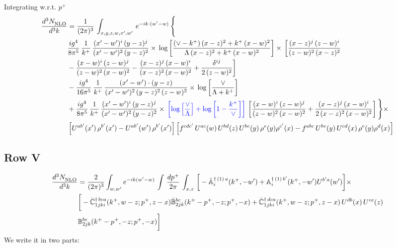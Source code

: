 \documentclass[9pt]{article}
\def\mf#1{\mathbb{#1}}
\numberwithin{equation}{section}
\begin{document}
Integrating w.r.t. $p^{+}$
\begin{align}
    \frac{d^{3}N_{\rm NLO}^{\rm}}{d^{3}k}  & =  \frac{1}{(2\pi)^{3}}\,
    \int_{x,y,z,w,x',w'}\,e^{-ik\cdot (w^\prime-w)}\,\Bigg\{\notag \\ & \frac{ig^{4}}{8\pi^{5}}\,\frac{1}{k^{+}}\,\frac{(x'-w')^{i}\,(y-z)^{j}}{(x'-w')^{2}\,(y-z)^{2}}\times\,\log{\left[\frac{(\vee-k^{+})\,(x-z)^{2}+k^{+}\,(x-w)^{2}}{\Lambda\, (x-z)^{2} + k^{+}\,(x-w)^{2}}\right]}\times\, \bigg[\frac{(x-z)^{j}\,(z-w)^{i}}{(z-w)^{2}\,(x-z)^{2}}\notag \\ & -\frac{(x-w)^{i}\,(z-w)^{j}}{(z-w)^{2}\,(x-w)^{2}}-\frac{(x-z)^{j}\,(x-w)^{i}}{(x-z)^{2}\,(x-w)^{2}}+\frac{\delta^{ij}}{2\,(z-w)^{2}}\bigg]\notag \\ & -\frac{ig^{4}}{16\pi^{5}}\,\frac{1}{k^{+}}\,\frac{(x'-w')\cdot (y-z)}{(x'-w')^{2}\,(y-z)^{2}\,(z-w)^{2}}\times\,\log{\left[\frac{\vee}{\Lambda + k^{+}}\right]}\notag \\ & + \frac{ig^{4}}{8\pi^{5}}\,\frac{1}{k^{+}}\,\frac{(x'-w')^{i}\,(y-z)^{j}}{(x'-w')^{2}\,(y-z)^{2}}\times\,{\color{blue}\left[\log{\left[\frac{\vee}{\Lambda}\right]} + \log{\left[1-\frac{k^{+}}{\vee}\right]}\right]}\,\left[\frac{(x-w)^{i}\,(z-w)^{j}}{(z-w)^{2}\,(x-w)^{2}}+\frac{(x-z)^{j}\,(x-w)^{i}}{2\, (x-z)^{2}\,(x-w)^{2}}\right] \Bigg\}\times\notag \\ &  \left[U^{ab'}(x')\,\rho^{b'}(x')-U^{ab'}(w')\,\rho^{b'}(x')\right] \left[f^{cdc'}\,U^{ac}(w)\,U^{bd}(z)\,U^{be}(y)\,\rho^{e}(y)\rho^{c'}(x)-f^{abc}\,U^{be}(y)\,U^{cd}(x)\,\rho^{e}(y)\rho^{d}(x)\right]
\end{align}
\subsection{Row V}
\begin{align}
    \frac{d^{3}N_{\rm NLO}^{\rm}}{d^{3}k}  & = \frac{2}{(2\pi)^{3}}  \int_{w, w^\prime} e^{-ik(w^\prime-w)}\, \int\, \frac{dp^{+}}{2\pi}\,\int_{x,z}\, \bigg[-\bar{\mf{A}}^{\dagger\,(1)\,a}_{i}(k^{+},-w^{\prime})+\mf{A}^{\dagger\, (1)\, b^{\prime}}_{i}(k^{+},-w^{\prime})U^{b^{\prime}a}(w^{\prime})\bigg]\times\notag \\ & \bigg[-\Bar{\mf{C}}^{\dagger\, bca}_{1jki}(k^{+},w-z;p^{+},z-x)\Bar{\mf{B}}^{bc}_{2jk}(k^{+}-p^{+},- z;p^{+},-x)+\bar{\mf{C}}^{\dagger\, dca}_{1jki}(k^+,w-z; p^+, z-x)\,U^{db}(x)\,U^{ce}(z) \notag \\ & {\mf{B}}^{be}_{2jk} (k^{+}-p^+, -z; p^+, -x) \bigg]\nonumber
\end{align}
We write it in two parts:
\end{document}
